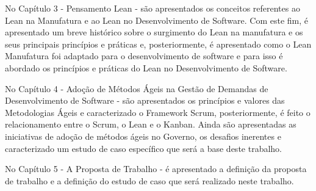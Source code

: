 No Capítulo 3 - Pensamento Lean - são apresentados os conceitos referentes ao Lean na Manufatura e ao Lean no Desenvolvimento de Software. Com este fim, é apresentado um breve histórico sobre o surgimento do Lean na manufatura e os seus principais princípios e práticas e, posteriormente, é apresentado como o Lean Manufatura foi adaptado para o desenvolvimento de software e para isso é abordado os princípios e práticas do Lean no Desenvolvimento de Software.

No Capítulo 4  - Adoção de Métodos Ágeis na Gestão de Demandas de Desenvolvimento de Software - são apresentados os princípios e valores das Metodologias Ágeis e caracterizado o Framework Scrum, posteriormente, é feito o relacionamento entre o Scrum, o Lean e o Kanban. Ainda são apresentadas as iniciativas de adoção de métodos ágeis no Governo, os desafios inerentes e caracterizado um estudo de caso específico que será a base deste trabalho.

No Capítulo 5 - A Proposta de Trabalho - é apresentado a definição da proposta de trabalho e a definição do estudo de caso que será realizado neste trabalho.
